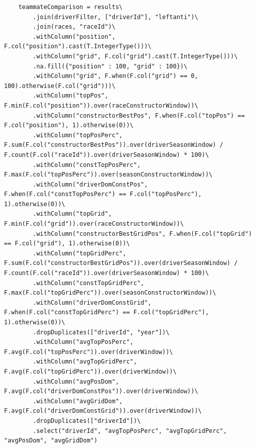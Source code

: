 \documentclass[12pt,twoside,titlepage]{report}
\begin{document}
\begin{lstlisting}
	teammateComparison = results\
		.join(driverFilter, ["driverId"], "leftanti")\
		.join(races, "raceId")\
		.withColumn("position", F.col("position").cast(T.IntegerType()))\
		.withColumn("grid", F.col("grid").cast(T.IntegerType()))\
		.na.fill({"position" : 100, "grid" : 100})\
		.withColumn("grid", F.when(F.col("grid") == 0, 100).otherwise(F.col("grid")))\
		.withColumn("topPos", F.min(F.col("position")).over(raceConstructorWindow))\
		.withColumn("constructorBestPos", F.when(F.col("topPos") == F.col("position"), 1).otherwise(0))\
		.withColumn("topPosPerc", F.sum(F.col("constructorBestPos")).over(driverSeasonWindow) / 
F.count(F.col("raceId")).over(driverSeasonWindow) * 100)\
		.withColumn("constTopPosPerc", F.max(F.col("topPosPerc")).over(seasonConstructorWindow))\
		.withColumn("driverDomConstPos", F.when(F.col("constTopPosPerc") == F.col("topPosPerc"), 1).otherwise(0))\
		.withColumn("topGrid", F.min(F.col("grid")).over(raceConstructorWindow))\
		.withColumn("constructorBestGridPos", F.when(F.col("topGrid") == F.col("grid"), 1).otherwise(0))\
		.withColumn("topGridPerc", F.sum(F.col("constructorBestGridPos")).over(driverSeasonWindow) / 
F.count(F.col("raceId")).over(driverSeasonWindow) * 100)\
		.withColumn("constTopGridPerc", F.max(F.col("topGridPerc")).over(seasonConstructorWindow))\
		.withColumn("driverDomConstGrid", F.when(F.col("constTopGridPerc") == F.col("topGridPerc"), 1).otherwise(0))\
		.dropDuplicates(["driverId", "year"])\
		.withColumn("avgTopPosPerc", F.avg(F.col("topPosPerc")).over(driverWindow))\
		.withColumn("avgTopGridPerc", F.avg(F.col("topGridPerc")).over(driverWindow))\
		.withColumn("avgPosDom", F.avg(F.col("driverDomConstPos")).over(driverWindow))\
		.withColumn("avgGridDom", F.avg(F.col("driverDomConstGrid")).over(driverWindow))\
		.dropDuplicates(["driverId"])\
		.select("driverId", "avgTopPosPerc", "avgTopGridPerc", "avgPosDom", "avgGridDom")


\end{lstlisting}
\end{document}
